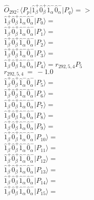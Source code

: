\documentclass[14pt]{article}
\begin{document}
    $\hat{O}_{292}:  \langle{P_p}\vert \hat{1}_{\beta}^{+}\hat{0}_{\beta}^{+}\hat{1}_{\alpha}^{-}\hat{0}_{\alpha}^{-} \vert{P_q}\rangle => $ \\ 
    $ \hat{1}_{\beta}^{+}\hat{0}_{\beta}^{+}\hat{1}_{\alpha}^{-}\hat{0}_{\alpha}^{-} \vert{P_{0}}\rangle =  $ \\ 
    $ \hat{1}_{\beta}^{+}\hat{0}_{\beta}^{+}\hat{1}_{\alpha}^{-}\hat{0}_{\alpha}^{-} \vert{P_{1}}\rangle =  $ \\ 
    $ \hat{1}_{\beta}^{+}\hat{0}_{\beta}^{+}\hat{1}_{\alpha}^{-}\hat{0}_{\alpha}^{-} \vert{P_{2}}\rangle =  $ \\ 
    $ \hat{1}_{\beta}^{+}\hat{0}_{\beta}^{+}\hat{1}_{\alpha}^{-}\hat{0}_{\alpha}^{-} \vert{P_{3}}\rangle =  $ \\ 
    $ \hat{1}_{\beta}^{+}\hat{0}_{\beta}^{+}\hat{1}_{\alpha}^{-}\hat{0}_{\alpha}^{-} \vert{P_{4}}\rangle = {r}_{292,5,4}P_{5} $ \\ 
    ${r}_{292,5,4}\ =\ -1.0 $ \\ 
    $ \hat{1}_{\beta}^{+}\hat{0}_{\beta}^{+}\hat{1}_{\alpha}^{-}\hat{0}_{\alpha}^{-} \vert{P_{5}}\rangle =  $ \\ 
    $ \hat{1}_{\beta}^{+}\hat{0}_{\beta}^{+}\hat{1}_{\alpha}^{-}\hat{0}_{\alpha}^{-} \vert{P_{6}}\rangle =  $ \\ 
    $ \hat{1}_{\beta}^{+}\hat{0}_{\beta}^{+}\hat{1}_{\alpha}^{-}\hat{0}_{\alpha}^{-} \vert{P_{7}}\rangle =  $ \\ 
    $ \hat{1}_{\beta}^{+}\hat{0}_{\beta}^{+}\hat{1}_{\alpha}^{-}\hat{0}_{\alpha}^{-} \vert{P_{8}}\rangle =  $ \\ 
    $ \hat{1}_{\beta}^{+}\hat{0}_{\beta}^{+}\hat{1}_{\alpha}^{-}\hat{0}_{\alpha}^{-} \vert{P_{9}}\rangle =  $ \\ 
    $ \hat{1}_{\beta}^{+}\hat{0}_{\beta}^{+}\hat{1}_{\alpha}^{-}\hat{0}_{\alpha}^{-} \vert{P_{10}}\rangle =  $ \\ 
    $ \hat{1}_{\beta}^{+}\hat{0}_{\beta}^{+}\hat{1}_{\alpha}^{-}\hat{0}_{\alpha}^{-} \vert{P_{11}}\rangle =  $ \\ 
    $ \hat{1}_{\beta}^{+}\hat{0}_{\beta}^{+}\hat{1}_{\alpha}^{-}\hat{0}_{\alpha}^{-} \vert{P_{12}}\rangle =  $ \\ 
    $ \hat{1}_{\beta}^{+}\hat{0}_{\beta}^{+}\hat{1}_{\alpha}^{-}\hat{0}_{\alpha}^{-} \vert{P_{13}}\rangle =  $ \\ 
    $ \hat{1}_{\beta}^{+}\hat{0}_{\beta}^{+}\hat{1}_{\alpha}^{-}\hat{0}_{\alpha}^{-} \vert{P_{14}}\rangle =  $ \\ 
    $ \hat{1}_{\beta}^{+}\hat{0}_{\beta}^{+}\hat{1}_{\alpha}^{-}\hat{0}_{\alpha}^{-} \vert{P_{15}}\rangle =  $ \\ 
    
\end{document}
